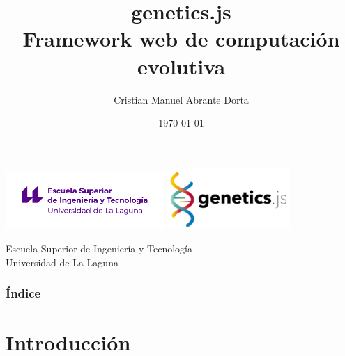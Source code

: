 \documentclass{beamer}
\title[genetics.js]{
    genetics.js \\
    Framework web de computación evolutiva
}
\author[Cristian Abrante]{Cristian Manuel Abrante Dorta}
\institute[ULL]{Universidad de La Laguna}
\date[21-06-2019]{\today}
\begin{document}
  
\begin{frame}

  \includegraphics[width=0.45\textwidth]{pres/img/etsit-logo.png}
  \hspace*{2cm}
  \includegraphics[width=0.35\textwidth]{pres/img/geneticsjs-logo.png}
  \titlepage

  \begin{scriptsize}
    \begin{center}
     Escuela Superior de Ingeniería y Tecnología \\
     Universidad de La Laguna
    \end{center}
  \end{scriptsize}

\end{frame}

\begin{frame}[allowframebreaks]
  \frametitle{Índice}  
  \tableofcontents[sections={1-3}]
  \framebreak
  \tableofcontents[sections={4-5}]
\end{frame}



\section{Introducción}
\end{document}
